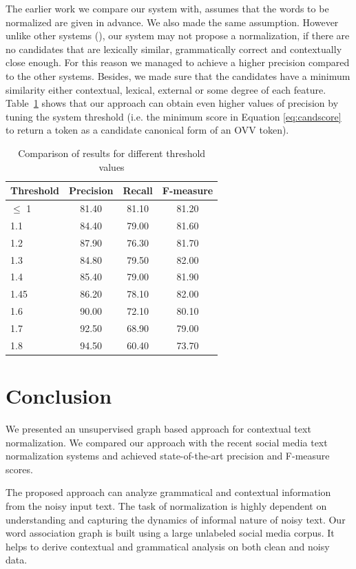 \documentclass[preprint,review,12pt]{elsarticle}
\begin{document}
The earlier work we compare our system with, assumes that the words to be normalized are given in advance. We also made the same assumption. However unlike other systems (\cite{DBLP:conf/emnlp/YangE13,liu2012broad,Han:2011:LNS:2002472.2002520}), our system may not propose a normalization, if there are no candidates that are lexically similar, grammatically correct and contextually close enough. For this reason we managed to achieve a higher precision compared to the other systems. Besides, we made sure that the candidates have a minimum similarity either contextual, lexical, external or some degree of each feature. Table~\ref{tab:thresholds} shows that our approach can obtain even higher values of precision by tuning the system threshold (i.e. the minimum score in Equation \ref{eq:candscore} to return a token as a candidate canonical form of an OVV token).

\begin{table}[thb]
  \centering
  \begin{tabular}[th]{lccc}
    \hline
    Threshold & Precision & Recall & F-measure \\
    \hline
    $\leq$ 1 & 81.40 & 81.10 & 81.20 \\
    1.1 & 84.40 & 79.00 & 81.60 \\
    1.2 & 87.90 & 76.30 & 81.70 \\
    1.3 & 84.80 & 79.50 & 82.00 \\
    1.4 & 85.40 & 79.00 & 81.90 \\
    1.45 & 86.20 & 78.10 & 82.00 \\
    1.6 & 90.00 & 72.10 & 80.10 \\
    1.7 & 92.50 & 68.90 & 79.00 \\
    1.8 & 94.50 & 60.40 & 73.70 \\
    \hline
  \end{tabular}
  \caption{Comparison of results for different threshold values}
\label{tab:thresholds}
\end{table}

\section{Conclusion}

We presented an unsupervised graph based approach for contextual text normalization. We compared our approach with the recent social media text normalization systems and achieved state-of-the-art precision and F-measure scores.

The proposed approach can analyze grammatical and contextual information from the noisy input text. The task of normalization is highly dependent on understanding and capturing the dynamics of informal nature of noisy text. Our word association graph is built using a large unlabeled social media corpus. It helps to derive contextual and grammatical analysis on both clean and noisy data.
\end{document}
